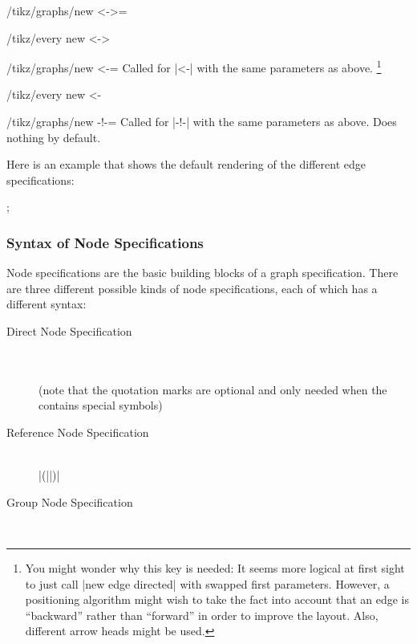 \begin{enumerate}
\begin{key}{/tikz/graphs/new <->=}
\begin{stylekey}{/tikz/every new <->}
    \end{stylekey}
  \end{key}
  \begin{key}{/tikz/graphs/new <-=}
    Called for |<-| with the same parameters as above.%
    \footnote{You might
      wonder why this key is needed: It seems more logical at first
      sight to just call |new edge directed| with swapped first
      parameters. However, a positioning
      algorithm might wish to take the fact into account that an edge is
      ``backward'' rather than ``forward''  in order to
      improve the layout. Also, different arrow heads might be used.}
    \begin{stylekey}{/tikz/every new <-}
    \end{stylekey}
  \end{key}
  \begin{key}{/tikz/graphs/new -!-=}
    Called for |-!-| with the same parameters as above. Does nothing
    by default.
  \end{key}
\end{enumerate}

Here is an example that shows the default rendering of the different
edge specifications:

\begin{codeexample}[]
\tikz {};  
\end{codeexample}



\subsubsection{Syntax of Node Specifications}

\label{section-library-graphs-node-spec}

Node specifications are the basic building blocks of a graph
specification. There are three different possible kinds of node
specifications, each of which has a different syntax: 

\begin{description}
\item[Direct Node Specification]
  \ \\
   \\
  (note that the quotation marks are optional and only needed when the
   contains special symbols)
\item[Reference Node Specification]
  \ \\
  |(||)|
\item[Group Node Specification]
  \ \\
\end{description}

